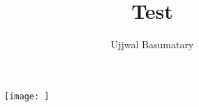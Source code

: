 \documentclass{article}
\title{Test}
\author{Ujjwal Basumatary}
\begin{document}
\maketitle
\begin{figure}[htpb]
	\centering
	\texttt{[image: ]}
	\caption{}
	\label{fig:}
\end{figure}
\end{document}

